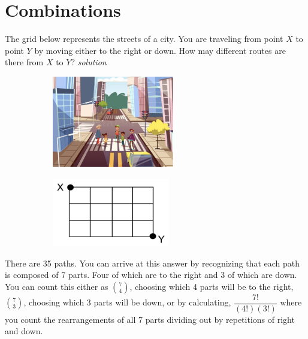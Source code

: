 \documentclass{amsbook}
\begin{document}
\section{Combinations}

\begin{Exercise}[title={Paths on a Grid},difficulty=1, label=c1]
The grid below represents the streets of a city. You are traveling from point $X$ to point $Y$ by moving either to the right or down. How may different routes are there from $X$ to $Y$? \hfill \emph{solution}  
    \begin{figure}[H]
    \begin{subfigure}{0.45\textwidth}
        \includegraphics[width=0.9\linewidth, height=4cm]{a.png}  
    \end{subfigure}
    \begin{subfigure}{0.45\textwidth}
      \includegraphics[width=0.9\linewidth, height=3cm]{b.png}
    \end{subfigure}
    \end{figure}
\end{Exercise}

\begin{Answer}[ref={c1}]
    There are 35 paths. You can arrive at this answer by recognizing that each path is composed of 7 parts. Four of which are to the right and 3 of which are down. You can count this either as ${7 \choose 4}$, choosing which 4 parts will be to the right, ${7 \choose 3}$, choosing which 3 parts will be down, or by calculating, $\dfrac{ 7!}{(4!)(3!)}$ where you count the rearrangements of all 7 parts dividing out by repetitions of right and down.
\end{Answer}
\end{document}
